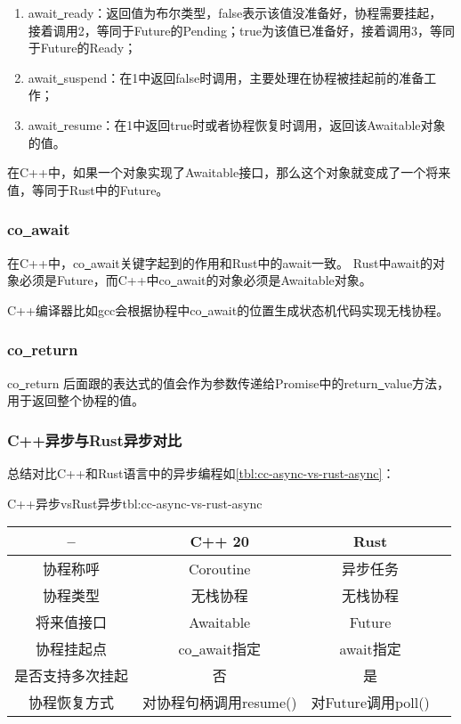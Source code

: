 \documentclass[supercite]{HustGraduPaper}
\newcommand{\rtbl}[1]{\autoref{tbl:#1}}
\theoremstyle{definition}
\begin{document}
\begin{enumerate}[label={(\arabic*)}]
  \item await\underline{~}ready：返回值为布尔类型，false表示该值没准备好，协程需要挂起，
    接着调用2，等同于Future的Pending；true为该值已准备好，接着调用3，等同于Future的Ready；
  \item await\underline{~}suspend：在1中返回false时调用，主要处理在协程被挂起前的准备工作；
  \item await\underline{~}resume：在1中返回true时或者协程恢复时调用，返回该Awaitable对象的值。
\end{enumerate}

在C++中，如果一个对象实现了Awaitable接口，那么这个对象就变成了一个将来值，等同于Rust中的Future。\par

\subsubsection{co\underline{~}await}
在C++中，co\underline{~}await关键字起到的作用和Rust中的await一致。
Rust中await的对象必须是Future，而C++中co\underline{~}await的对象必须是Awaitable对象。\par

C++编译器比如gcc会根据协程中co\underline{~}await的位置生成状态机代码实现无栈协程。\par

\subsubsection{co\underline{~}return}

co\underline{~}return 后面跟的表达式的值会作为参数传递给Promise中的return\underline{~}value方法，
用于返回整个协程的值。\par

\subsubsection{C++异步与Rust异步对比}
总结对比C++和Rust语言中的异步编程如\rtbl{cc-async-vs-rust-async}：

\begin{generaltab}{C++异步vsRust异步}{tbl:cc-async-vs-rust-async}
  \begin{tabular}{c|ccc}
    \toprule
    -- & C++ 20 & Rust \\
    \midrule
    协程称呼 & Coroutine & 异步任务 \\
    协程类型 & 无栈协程 & 无栈协程 \\
    将来值接口 & Awaitable & Future \\
    协程挂起点 & co\underline{~}await指定 & await指定 \\
    是否支持多次挂起 & 否 & 是 \\
    协程恢复方式 & 对协程句柄调用resume() & 对Future调用poll() \\
    \bottomrule
  \end{tabular}
\end{generaltab}
\end{document}
